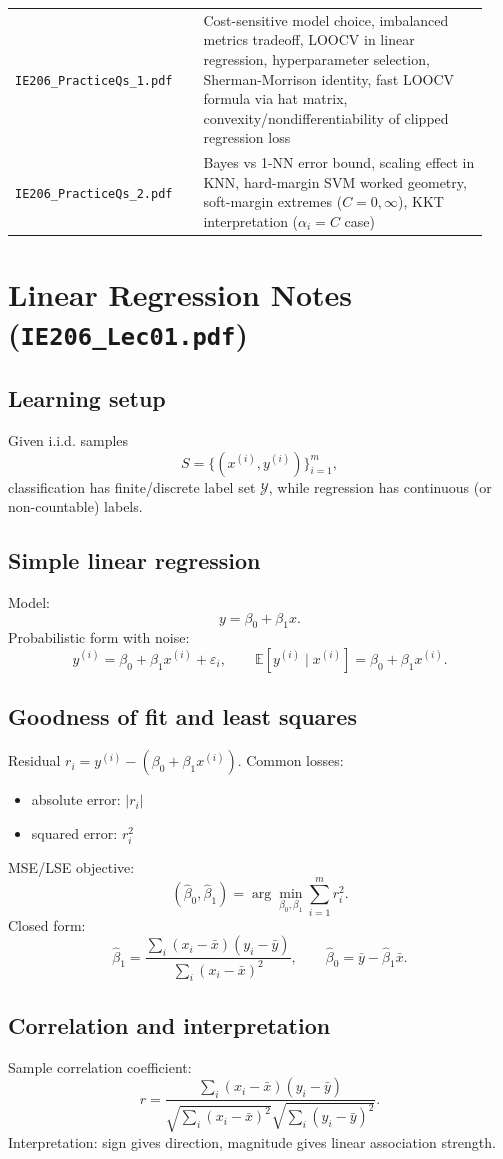 \documentclass[11pt]{article}
\newcommand{\E}{\mathbb{E}}
\newcommand{\1}{\mathbf{1}}
\begin{document}
\begin{center}
\begin{tabular}{>{\raggedright\arraybackslash}p{0.37\linewidth} >{\raggedright\arraybackslash}p{0.57\linewidth}}
\texttt{IE206\_PracticeQs\_1.pdf} & Cost-sensitive model choice, imbalanced metrics tradeoff, LOOCV in linear regression, hyperparameter selection, Sherman-Morrison identity, fast LOOCV formula via hat matrix, convexity/nondifferentiability of clipped regression loss \\
\texttt{IE206\_PracticeQs\_2.pdf} & Bayes vs 1-NN error bound, scaling effect in KNN, hard-margin SVM worked geometry, soft-margin extremes ($C=0,\infty$), KKT interpretation ($\alpha_i=C$ case) \\
\bottomrule
\end{tabular}
\end{center}

\section{Linear Regression Notes (\texttt{IE206\_Lec01.pdf})}
\subsection*{Learning setup}
Given i.i.d. samples
\[
S=\{(x^{(i)},y^{(i)})\}_{i=1}^m,
\]
classification has finite/discrete label set $\mathcal Y$, while regression has continuous (or non-countable) labels.

\subsection*{Simple linear regression}
Model:
\[
y=\beta_0+\beta_1x.
\]
Probabilistic form with noise:
\[
y^{(i)}=\beta_0+\beta_1x^{(i)}+\varepsilon_i,
\qquad \E[y^{(i)}\mid x^{(i)}]=\beta_0+\beta_1x^{(i)}.
\]

\subsection*{Goodness of fit and least squares}
Residual $r_i=y^{(i)}-(\beta_0+\beta_1x^{(i)})$. Common losses:
\begin{itemize}
\item absolute error: $|r_i|$
\item squared error: $r_i^2$
\end{itemize}
MSE/LSE objective:
\[
(\hat\beta_0,\hat\beta_1)=\arg\min_{\beta_0,\beta_1}\sum_{i=1}^m r_i^2.
\]
Closed form:
\[
\hat\beta_1=\frac{\sum_i(x_i-\bar x)(y_i-\bar y)}{\sum_i(x_i-\bar x)^2},
\qquad
\hat\beta_0=\bar y-\hat\beta_1\bar x.
\]

\subsection*{Correlation and interpretation}
Sample correlation coefficient:
\[
r=\frac{\sum_i(x_i-\bar x)(y_i-\bar y)}{\sqrt{\sum_i(x_i-\bar x)^2}\sqrt{\sum_i(y_i-\bar y)^2}}.
\]
Interpretation: sign gives direction, magnitude gives linear association strength.
\end{document}
